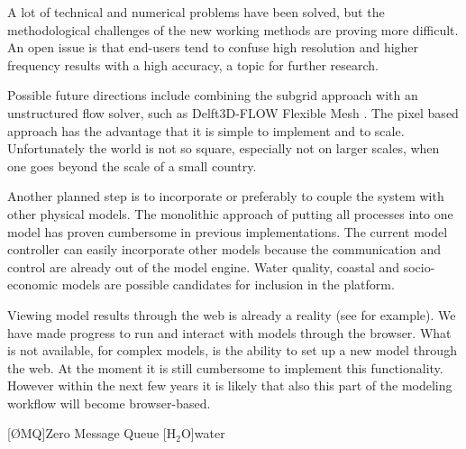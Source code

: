 \documentclass[a4paper]{article}
\begin{document}
A lot of technical and numerical problems have been solved, but the methodological challenges of the new working methods are proving more difficult. An open issue is that end-users tend to confuse high resolution and higher frequency results with a high accuracy, a topic for further research.

Possible future directions include combining the subgrid approach with an unstructured flow solver, such as Delft3D-FLOW Flexible Mesh \citep{Kernkamp2011}. The pixel based approach has the advantage that it is simple to implement and to scale. Unfortunately the world is not so square, especially not on larger scales, when one goes beyond the scale of a small country.

Another planned step is to incorporate or preferably to couple the system with other physical models. The monolithic approach of putting all processes into one model has proven cumbersome in previous implementations. The current model controller can easily incorporate other models because the communication and control are already out of the model engine. Water quality, coastal and socio-economic models are possible candidates for inclusion in the platform.

Viewing model results through the web is already a reality (see \citep{Blower2013} for example). We have made progress to run and interact with models through the browser. What is not available, for complex models, is the ability to set up a new model through the web. At the moment it is still cumbersome to implement this functionality. However within the next few years it is likely that also this part of the modeling workflow will become browser-based.



\begin{acronym}[AAAAA]
[\O{}MQ]{Zero Message Queue}
[$\mathrm{H_2O}$]{water}
\end{acronym}
\end{document}
